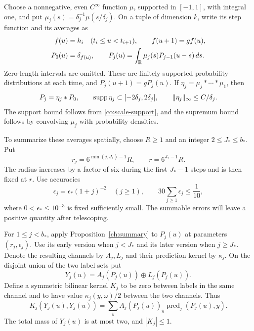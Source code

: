 Choose a nonnegative, even $C^\infty$ function $\mu$, supported in
$[-1,1]$, with integral one, and put
$\mu_j(s)=\delta_j^{-1}\mu(s/\delta_j)$.  On a tuple of dimension $k$,
write its step function and its averages as
\begin{equation}
 \begin{split}
 f(u)&=h_i\quad(t_i\leq u<t_{i+1}),\qquad f(u+1)=gf(u),\\
 P_0(u)&=\delta_{f(u)},\qquad
 P_j(u)=\int_{\mathbb R}\mu_j(s)P_{j-1}(u-s)\,ds.
 \end{split}
 \label{co:averages}
\end{equation}
Zero-length intervals are omitted.  These are finitely supported
probability distributions at each time, and
$P_j(u+1)=gP_j(u)$.  If
$\eta_j=\mu_j*\cdots*\mu_1$, then
\begin{equation}
 P_j=\eta_j*P_0,\qquad
 \operatorname{supp}\eta_j\subset[-2\delta_j,2\delta_j],\qquad
 \|\eta_j\|_\infty\leq C/\delta_j.
 \label{co:smearing}
\end{equation}
The support bound follows from \eqref{co:scale-support}, and the supremum
bound follows by convolving $\mu_j$ with probability densities.

To summarize these averages spatially, choose $R\geq1$ and an integer
$2\leq J_*\leq b_*$.  Put
\begin{equation}
 r_j=6^{\min(j,J_*)-1}R,\qquad r=6^{J_*-1}R.
 \label{co:spatial-radii}
\end{equation}
The radius increases by a factor of six during the first $J_*-1$ steps
and is then fixed at $r$.  Use accuracies
\begin{equation}
 \epsilon_j=\epsilon_*(1+j)^{-2}\quad(j\geq1),
 \qquad 30\sum_{j\geq1}\epsilon_j\leq\frac1{10},
 \label{co:error-budget}
\end{equation}
where $0<\epsilon_*\leq10^{-3}$ is fixed sufficiently small.
The summable errors will leave a positive quantity after telescoping.

For $1\leq j<b_*$, apply Proposition~\ref{ch:summary} to $P_j(u)$ at
parameters $(r_j,\epsilon_j)$.  Use its early version when $j<J_*$ and its
later version when $j\geq J_*$.  Denote the resulting channels by $A_j,L_j$
and their prediction kernel by $\kappa_j$.  On the disjoint union of the
two label sets put
\begin{equation}
 Y_j(u)=A_j(P_j(u))\oplus L_j(P_j(u)).
 \label{co:channel-fields}
\end{equation}
Define a symmetric bilinear kernel $K_j$ to be zero between labels in the
same channel and to have value $\kappa_j(y,\omega)/2$ between the two
channels.  Thus
\begin{equation}
 K_j(Y_j(u),Y_j(u))
 =\sum_y A_j(P_j(u))_y\operatorname{pred}_j(P_j(u),y).
 \label{co:channel-pairing}
\end{equation}
The total mass of $Y_j(u)$ is at most two, and $|K_j|\leq1$.

